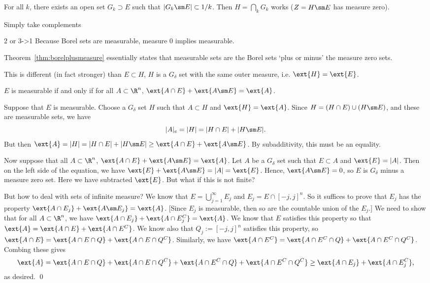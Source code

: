 \pf For all $k$, there exists an open set $G_k \supset E$ such that $|G_k\sm E| \subset 1/k$. Then $H= \bigcap_k G_k$ works ($Z=H \sm E$ has measure zero). 



Simply take complements

2 or 3->1 Because Borel sets are measurable, measure 0 implies measurable. 




Theorem~\ref{thm:borelplusmeasure} essentially states that measurable sets are the Borel sets `plus or minus' the measure zero sets. 



\begin{rem}
This is different (in fact stronger) than $E \subset H$, $H$ is a $G_\delta$ set with the same outer measure, i.e. $\ext{H}=\ext{E}$. 
\end{rem}

\begin{thm}
$E$ is measurable if and only if for all $A \subset \R^n$, $\ext{A \cap E}+\ext{A\sm E}=\ext{A}$.
\end{thm}

\pf Suppose that $E$ is measurable. Choose a $G_\delta$ set $H$ such that $A \subset H$ and $\ext{H}=\ext{A}$. Since $H= (H \cap E) \cup (H \sm E)$, and these are measurable sets, we have
	\[
	|A|_e=|H|= |H \cap E| + |H \sm E|.
	\]
But then $\ext{A} = |H|= |H \cap E| + |H\sm E| \geq \ext{A \cap E} + \ext{A \sm E}$. By subadditivity, this must be an equality. 

Now suppose that all $A \subset \R^n$, $\ext{A \cap E}+\ext{A\sm E}=\ext{A}$. Let $A$ be a $G_\delta$ set such that $E \subset A$ and $\ext{E}=|A|$. Then on the left side of the equation, we have $\ext{E}+\ext{A\sm E}= |A|=\ext{E}$. Hence, $\ext{A \sm E}=0$, so $E$ is $G_\delta$ minus a measure zero set. Here we have subtracted $\ext{E}$. But what if this is not finite? 

But how to deal with sets of infinite measure? We know that $E= \bigcup_{j=1}^\infty E_j$ and $E_j= E \cap [-j,j]^n$. So it suffices to prove that $E_j$ has the property $\ext{A \cap E_j}+\ext{A\sm E_j}=\ext{A}$. [Since $E_j$ is measurable, then so are the countable union of the $E_j$.] We need to show that for all $A \subset \R^n$, we have $\ext{A \cap E_j} + \ext{A \cap E_j^C}=\ext{A}$. We know that $E$ satisfies this property so that $\ext{A}= \ext{A \cap E} + \ext{A \cap E^C}$. We know also that $Q_j:= [-j,j]^n$ satisfies this property, so $\ext{A \cap E}= \ext{A \cap E \cap Q}+ \ext{A \cap E \cap Q^C}$. Similarly, we have $\ext{A \cap E^C}= \ext{A \cap E^C \cap Q}+ \ext{A \cap E^C \cap Q^C}$. Combing these gives
	\[
	\ext{A}= \ext{A \cap E \cap Q} + \ext{A \cap E \cap Q^C} + \ext{A \cap E^C \cap Q}+ \ext{A \cap E^C \cap Q^C} \geq \ext{A \cap E_j} + \ext{A \cap E_j^C},
	\]
as desired. \qed \\

